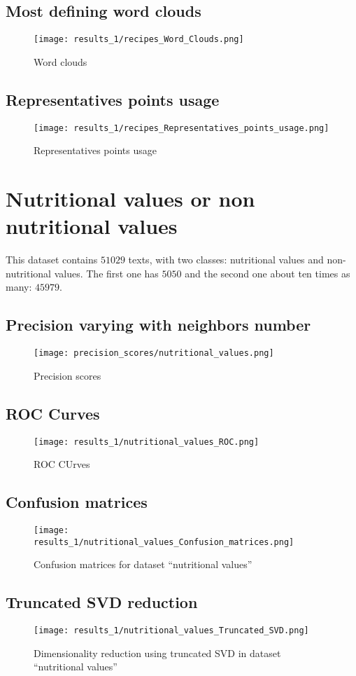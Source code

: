 \documentclass[\main/main.tex]{subfiles}
\begin{document}
\subsection{Most defining word clouds}
\begin{figure}
	\texttt{[image: results\_1/recipes\_Word\_Clouds.png]}
	\caption{Word clouds}
\end{figure}
\subsection{Representatives points usage}
\begin{figure}
	\texttt{[image: results\_1/recipes\_Representatives\_points\_usage.png]}
	\caption{Representatives points usage}
\end{figure}

\clearpage
\section{Nutritional values or non nutritional values}
This dataset contains \(51029\) texts, with two classes: nutritional values and non-nutritional values. The first one has \(5050\) and the second one about ten times as many: \(45979\).
\subsection{Precision varying with neighbors number}
\begin{figure}
	\texttt{[image: precision\_scores/nutritional\_values.png]}
	\caption{Precision scores}
\end{figure}
\subsection{ROC Curves}
\begin{figure}
	\texttt{[image: results\_1/nutritional\_values\_ROC.png]}
	\caption{ROC CUrves}
\end{figure}
\subsection{Confusion matrices}
\begin{figure}
	\texttt{[image: results\_1/nutritional\_values\_Confusion\_matrices.png]}
	\caption{Confusion matrices for dataset ``nutritional values''}
\end{figure}
\subsection{Truncated SVD reduction}
\begin{figure}
	\texttt{[image: results\_1/nutritional\_values\_Truncated\_SVD.png]}
	\caption{Dimensionality reduction using truncated SVD in dataset ``nutritional values''}
\end{figure}
\end{document}
